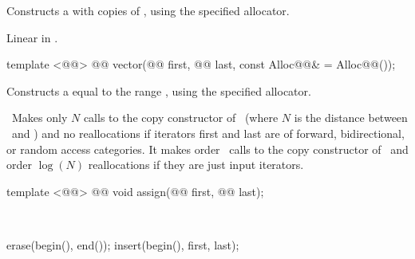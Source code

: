 \documentclass[american,twoside]{book}
\begin{document}
\begin{itemdescr}
\pnum
\effects Constructs a  with 
copies of , using the specified allocator.

\pnum
{}

\pnum
\complexity Linear in .
\end{itemdescr}

\begin{itemdecl}
template <@@>
  @@
  vector(@@ first, @@ last,
         const Alloc@@& = Alloc@@());
\end{itemdecl}

\begin{itemdescr}

\pnum
\effects Constructs a  equal to the
range , using the specified allocator.

\pnum
\complexity\ 
Makes only $N$
calls to the copy constructor of
\
(where $N$
is the distance between
\
and
)
and no reallocations if iterators first and last are of forward, bidirectional, or random access categories.
It makes order
\tcode{N}\
calls to the copy constructor of
\tcode{T}\
and order
$\log(N)$
reallocations if they are just input iterators.
\end{itemdescr}

%
\begin{itemdecl}
template <@@>
  @@
  void assign(@@ first, @@ last);
\end{itemdecl}

\begin{itemdescr}
\pnum
\effects\ 
\begin{codeblock}
erase(begin(), end());
insert(begin(), first, last);
\end{codeblock}
\end{itemdescr}
\end{document}
